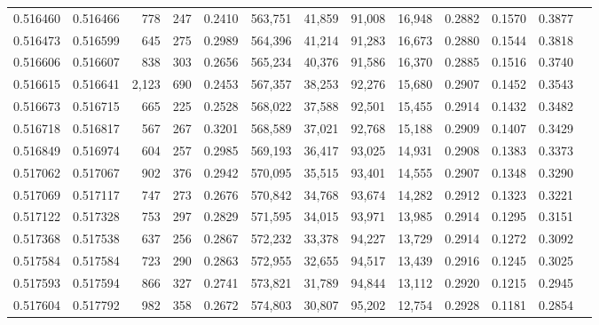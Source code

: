 \begin{tabular}{rrrrrrrrrrrrr}
0.516460 & 0.516466 &    778 &   247 &                                     0.2410 & 563,751 &  41,859 &  91,008 &  16,948 & 0.2882 & 0.1570 & 0.3877 \\
0.516473 & 0.516599 &    645 &   275 &                                     0.2989 & 564,396 &  41,214 &  91,283 &  16,673 & 0.2880 & 0.1544 & 0.3818 \\
0.516606 & 0.516607 &    838 &   303 &                                     0.2656 & 565,234 &  40,376 &  91,586 &  16,370 & 0.2885 & 0.1516 & 0.3740 \\
0.516615 & 0.516641 &  2,123 &   690 &                                     0.2453 & 567,357 &  38,253 &  92,276 &  15,680 & 0.2907 & 0.1452 & 0.3543 \\
0.516673 & 0.516715 &    665 &   225 &                                     0.2528 & 568,022 &  37,588 &  92,501 &  15,455 & 0.2914 & 0.1432 & 0.3482 \\
0.516718 & 0.516817 &    567 &   267 &                                     0.3201 & 568,589 &  37,021 &  92,768 &  15,188 & 0.2909 & 0.1407 & 0.3429 \\
0.516849 & 0.516974 &    604 &   257 &                                     0.2985 & 569,193 &  36,417 &  93,025 &  14,931 & 0.2908 & 0.1383 & 0.3373 \\
0.517062 & 0.517067 &    902 &   376 &                                     0.2942 & 570,095 &  35,515 &  93,401 &  14,555 & 0.2907 & 0.1348 & 0.3290 \\
0.517069 & 0.517117 &    747 &   273 &                                     0.2676 & 570,842 &  34,768 &  93,674 &  14,282 & 0.2912 & 0.1323 & 0.3221 \\
0.517122 & 0.517328 &    753 &   297 &                                     0.2829 & 571,595 &  34,015 &  93,971 &  13,985 & 0.2914 & 0.1295 & 0.3151 \\
0.517368 & 0.517538 &    637 &   256 &                                     0.2867 & 572,232 &  33,378 &  94,227 &  13,729 & 0.2914 & 0.1272 & 0.3092 \\
0.517584 & 0.517584 &    723 &   290 &                                     0.2863 & 572,955 &  32,655 &  94,517 &  13,439 & 0.2916 & 0.1245 & 0.3025 \\
0.517593 & 0.517594 &    866 &   327 &                                     0.2741 & 573,821 &  31,789 &  94,844 &  13,112 & 0.2920 & 0.1215 & 0.2945 \\
0.517604 & 0.517792 &    982 &   358 &                                     0.2672 & 574,803 &  30,807 &  95,202 &  12,754 & 0.2928 & 0.1181 & 0.2854 \\

\end{tabular}

